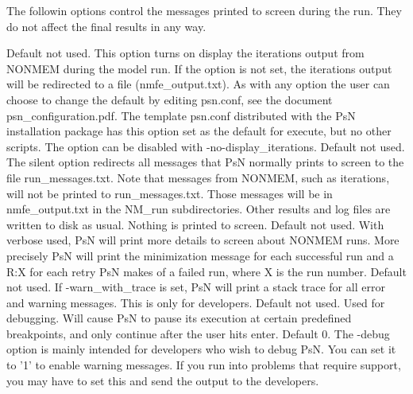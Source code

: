 The followin options control the messages printed to screen during the run.
They do not affect the final results in any way.
\begin{optionlist}
Default not used.  This option turns on display the iterations output from NONMEM during the model run. 
If the option is not set, the iterations output will be redirected to a file (nmfe\_output.txt). 
As with any option the user can choose to change the default by editing psn.conf, 
see the document psn\_configuration.pdf. 
The template psn.conf distributed with the PsN installation package has this option set as the default for execute, 
but no other scripts. The option can be disabled with -no-display\_iterations. 
\nextopt
{}
Default not used. The silent option redirects all messages that PsN normally prints 
to screen to the file run\_messages.txt. Note that messages from NONMEM, such as iterations,
will not be printed to run\_messages.txt. Those messages will be in nmfe\_output.txt in the NM\_run
subdirectories.
Other results and log files are written to disk as usual. Nothing is printed to screen. 
\nextopt
{}
Default not used. With verbose used, PsN will print more details to screen
about NONMEM runs. More precisely PsN will print the minimization message for each successful run 
and a R:X for each retry PsN makes of a failed run, where X is the run number. 
\nextopt
{}
Default not used. If -warn\_with\_trace is set, PsN will print a stack trace for all error and warning messages. 
This is only for developers. 
\nextopt
{}
Default not used. Used for debugging. Will cause PsN to pause its execution at certain predefined breakpoints,
and only continue after the user hits enter.
\nextopt
{}
Default 0. The -debug option is mainly intended for developers who wish to debug PsN. 
You can set it to '1' to enable warning messages. If you run into problems that require support, 
you may have to set this and send the output to the developers. 
\nextopt
\end{optionlist}
